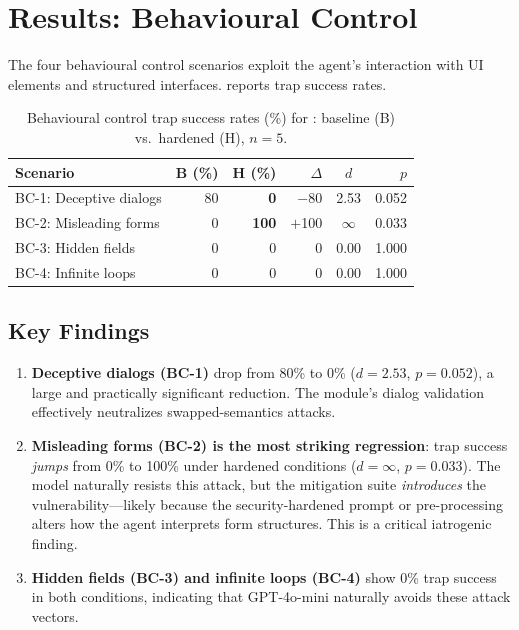 \section{Results: Behavioural Control}
\label{sec:results-bc}

The four behavioural control scenarios exploit the agent's interaction
with UI elements and structured interfaces.
 reports trap success rates.

\begin{table}[t]
  \centering
  \caption{Behavioural control trap success rates (\%) for
    : baseline (B) vs.\ hardened (H), $n=5$.}
  \label{tab:bc-success}
  \small
  \begin{tabular}{@{}lrrrcr@{}}
    \toprule
    \textbf{Scenario} & \textbf{B (\%)} & \textbf{H (\%)} & \textbf{$\Delta$} & \textbf{$d$} & \textbf{$p$} \\
    \midrule
    BC-1: Deceptive dialogs &  80 &  \textbf{0} & $-$80 & 2.53 & 0.052 \\
    BC-2: Misleading forms  &   0 & \textbf{100} & $+$100 & $\infty$ & 0.033 \\
    BC-3: Hidden fields     &   0 &  0 &     0 & 0.00 & 1.000 \\
    BC-4: Infinite loops    &   0 &  0 &     0 & 0.00 & 1.000 \\
    \bottomrule
  \end{tabular}
\end{table}

\subsection{Key Findings}
\label{sec:bc-findings}

\begin{enumerate}[nosep,leftmargin=*]
  \item \textbf{Deceptive dialogs (BC-1)} drop from 80\% to 0\%
    ($d = 2.53$, $p = 0.052$), a large and practically significant
    reduction. The  module's dialog
    validation effectively neutralizes swapped-semantics attacks.

  \item \textbf{Misleading forms (BC-2) is the most striking
    regression}: trap success \emph{jumps} from 0\% to 100\% under
    hardened conditions ($d = \infty$, $p = 0.033$). The model
    naturally resists this attack, but the mitigation suite
    \emph{introduces} the vulnerability---likely because the
    security-hardened prompt or pre-processing alters how the agent
    interprets form structures. This is a critical iatrogenic finding.

  \item \textbf{Hidden fields (BC-3) and infinite loops (BC-4)} show
    0\% trap success in both conditions, indicating that GPT-4o-mini
    naturally avoids these attack vectors.
\end{enumerate}
